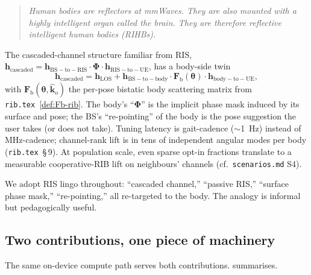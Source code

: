 \documentclass[11pt,a4paper]{article}
\theoremstyle{definition}
\newcommand{\Frib}{\mathbf{F}_{\mathrm{b}}}
\newcommand{\Phimat}{\mathbf{\Phi}}
\newcommand{\hh}{\mathbf{h}}
\newcommand{\thetab}{\bm{\theta}}
\newcommand{\kout}{\hat{\bm{k}}_{\mathrm{o}}}
\begin{document}
\begin{quote}
\emph{Human bodies are reflectors at mmWaves.  They are also mounted
with a highly intelligent organ called the brain.  They are
therefore reflective intelligent human bodies (RIHBs).}
\end{quote}

The cascaded-channel structure familiar from RIS,
$\hh_{\mathrm{cascaded}} = \hh_{\mathrm{BS-to-RIS}}\cdot
\Phimat\cdot\hh_{\mathrm{RIS-to-UE}}$, has a body-side twin
\begin{equation}\label{eq:cascaded-body}
  \hh_{\mathrm{cascaded}}=\hh_{\mathrm{LOS}}+
   \hh_{\mathrm{BS-to-body}}\cdot
   \Frib(\thetab)\cdot
   \hh_{\mathrm{body-to-UE}},
\end{equation}
with $\Frib(\thetab,\kout)$ the per-pose bistatic body scattering
matrix from \texttt{rib.tex}~\cref{def:Fb-rib}.  The body's
``$\Phimat$'' is the implicit phase mask induced by its surface and
pose; the BS's ``re-pointing'' of the body is the pose suggestion
the user takes (or does not take).  Tuning latency is gait-cadence
($\sim$\SI{1}{\Hz}) instead of MHz-cadence; channel-rank lift is
in tens of independent angular modes per body
(\texttt{rib.tex}~\S\,9).  At population scale, even sparse opt-in
fractions translate to a measurable cooperative-RIB lift on
neighbours' channels (cf.\ \texttt{scenarios.md} S4).

We adopt RIS lingo throughout: ``cascaded channel,''
``passive RIS,'' ``surface phase mask,'' ``re-pointing,'' all
re-targeted to the body.  The analogy is informal but pedagogically
useful.

\subsection{Two contributions, one piece of machinery}

The same on-device compute path serves both contributions.
 summarises.
\end{document}

